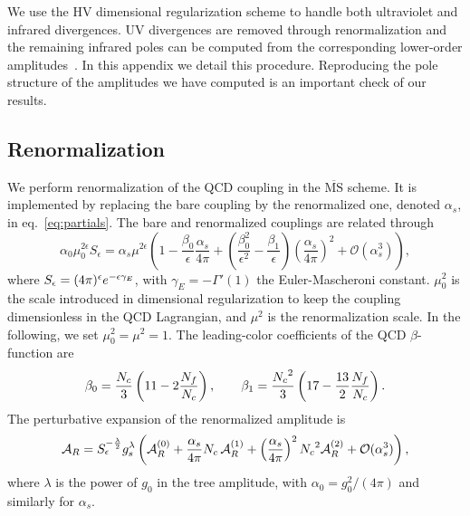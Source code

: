 We use the HV dimensional regularization
scheme to handle both ultraviolet and infrared divergences.
UV divergences are removed through renormalization and the
remaining infrared poles can be computed from the corresponding
lower-order
amplitudes~\cite{Catani:1998bh,Sterman:2002qn,Becher:2009cu,
Gardi:2009qi}. In this appendix we detail this procedure.
Reproducing the pole structure of the amplitudes we have 
computed is an important check of our results.


\subsection{Renormalization}

We perform renormalization of the QCD coupling in the 
$\overline{\text{MS}}$ scheme. It is implemented by replacing 
the bare coupling by the renormalized one, denoted $\alpha_s$, 
in eq.~\eqref{eq:partials}.
The bare and renormalized couplings are related through
\begin{equation}\label{eq:renormCoupling}
    \alpha_0\mu_0^{2\epsilon}S_{\epsilon}
  =\alpha_s\mu^{2\epsilon}\left(
  1-\frac{\beta_0}{\epsilon}\frac{\alpha_s}{4\pi}
  +\left(\frac{\beta_0^2}{\epsilon^2}-\frac{\beta_1}{\epsilon}\right)
  \left(\frac{\alpha_s}{4\pi}\right)^2+\mathcal{O}
  \left(\alpha_s^3\right)\right),
\end{equation}
where $S_\epsilon=(4\pi)^{\epsilon}e^{-\epsilon\gamma_E}$, with
$\gamma_E=-\Gamma'(1)$ the Euler-Mascheroni constant.
$\mu_0^2$ is the scale introduced in dimensional regularization
to keep the coupling dimensionless in the QCD Lagrangian, 
and $\mu^2$ is the renormalization scale. In the following, we
set $\mu_0^2=\mu^2=1$. The leading-color coefficients of the QCD
$\beta$-function are
\begin{equation}
  \beta_0=\frac{{N_c}}{3} \left( 11 - 2\frac{N_f}{{N_c}}
  \right),\qquad
  \beta_1=\frac{{N_c}^2}{3} \left( 17 - \frac{13}{2} \frac{N_f}{{N_c}} \right).
\end{equation}
The perturbative expansion of the renormalized amplitude is
\begin{equation}\label{eq:renormAmp}
  \mathcal{A}_R = S_\epsilon^{-\frac{\lambda}{2}}
  g_s^\lambda\left(
  \mathcal{A}_R^{(0)}
  +\frac{\alpha_s}{4\pi}{N_c}\,\mathcal{A}_R^{(1)}
  +\left(\frac{\alpha_s}{4\pi}\right)^2{N_c}^2\mathcal{A}_R^{(2)}
  +\mathcal{O}(\alpha_s^3)
  \right),
\end{equation}
where $\lambda$ is the power of $g_0$ in the tree amplitude, 
with $\alpha_0=g_0^2/(4\pi)$ and similarly for $\alpha_s$.
